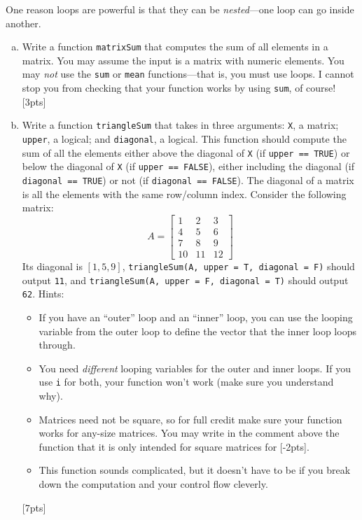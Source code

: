 \documentclass[12pt]{article}
\begin{document}
One reason loops are powerful is that they can be \textit{nested}---one loop can go inside another.

\begin{enumerate}[(a)]
	\item Write a function \verb|matrixSum| that computes the sum of all elements in a matrix. You may assume the input is a matrix with numeric elements. You may \textit{not} use the \verb|sum| or \verb|mean| functions---that is, you must use loops. I cannot stop you from checking that your function works by using \verb|sum|, of course! [3pts]
	\item Write a function \verb|triangleSum| that takes in three arguments: \verb|X|, a matrix; \verb|upper|, a logical; and \verb|diagonal|, a logical. This function should compute the sum of all the elements either above the diagonal of \verb|X| (if \verb|upper == TRUE|) or below the diagonal of \verb|X| (if \verb|upper == FALSE|), either including the diagonal (if \verb|diagonal == TRUE|) or not (if \verb|diagonal == FALSE|). The diagonal of a matrix is all the elements with the same row/column index. Consider the following matrix:
	\[A =
	\begin{bmatrix}
	1 & 2 & 3 \\
	4 & 5 & 6 \\
	7 & 8 & 9 \\
	10 & 11 & 12
	\end{bmatrix}\]
	Its diagonal is $[1,5,9]$, \verb|triangleSum(A, upper = T, diagonal = F)| should output \verb|11|, and \verb|triangleSum(A, upper = F, diagonal = T)| should output \verb|62|.
	Hints:
	\begin{itemize}
		\item If you have an ``outer'' loop and an ``inner'' loop, you can use the looping variable from the outer loop to define the vector that the inner loop loops through.
		\item You need \textit{different} looping variables for the outer and inner loops. If you use \verb|i| for both, your function won't work (make sure you understand why).
		\item Matrices need not be square, so for full credit make sure your function works for any-size matrices. You may write in the comment above the function that it is only intended for square matrices for [-2pts].
		\item This function sounds complicated, but it doesn't have to be if you break down the computation and your control flow cleverly.
	\end{itemize}
	[7pts]
\end{enumerate}
\end{document}
